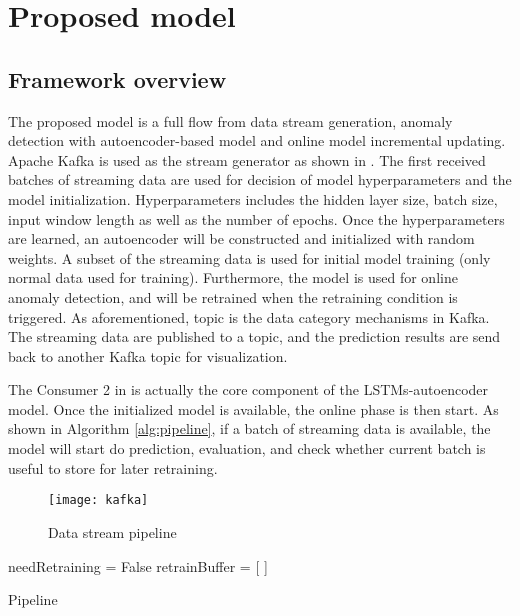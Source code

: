 \chapter{Proposed model}
\label{Proposed model}

\section{Framework overview}
\label{sec:framework}

The proposed model is a full flow from data stream generation, anomaly detection with autoencoder-based model and online model incremental updating. Apache Kafka is used as the stream generator as shown in . The first received batches of streaming data are used for decision of model hyperparameters and the model initialization. Hyperparameters includes the hidden layer size, batch size, input window length as well as the number of epochs. Once the hyperparameters are learned, an autoencoder will be constructed and initialized with random weights. A subset of the streaming data is used for initial model training (only normal data used for training). Furthermore, the model is used for online anomaly detection, and will be retrained when the retraining condition is triggered. As aforementioned, topic is the data category mechanisms in Kafka. The streaming data are published to a topic, and the prediction results are send back to another Kafka topic for visualization.

The Consumer 2 in  is actually the core component of the LSTMs-autoencoder model. Once the initialized model is available, the online phase is then start. As shown in Algorithm \ref{alg:pipeline}, if a batch of streaming data is available, the model will start do prediction, evaluation, and check whether current batch is useful to store for later retraining. 


\begin{figure}[h]
\centering
\texttt{[image: kafka]}
\caption[Data stream pipeline]{Data stream pipeline}
\label{fig:kafka}
\end{figure}

\begin{algorithm}[t]

\BlankLine 
needRetraining = False\;
retrainBuffer = [ ]\;
 \caption{Pipeline}
\label{alg:pipeline}
\end{algorithm}



